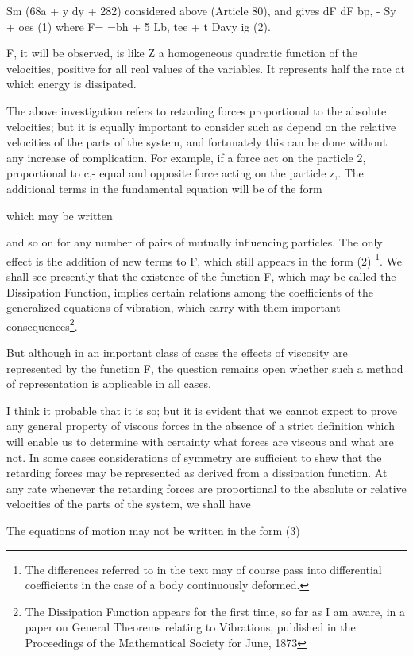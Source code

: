 Sm (68a + y dy + 282) considered above (Article 80), and gives dF dF bp, - Sy +
oes (1) where F= =bh + 5 Lb, tee + t Davy ig (2).

F, it will be observed, is like Z a homogeneous quadratic function of the
velocities, positive for all real values of the variables. It represents half
the rate at which energy is dissipated.

The above investigation refers to retarding forces proportional to the absolute
velocities; but it is equally important to consider such as depend on the
relative velocities of the parts of the system, and fortunately this can be
done without any increase of complication. For example, if a force act on the
particle 2, proportional to c,- equal and opposite force acting on the particle
z,. The additional terms in the fundamental equation will be of the form

which may be written

and so on for any number of pairs of mutually influencing particles.  The only
effect is the addition of new terms to F, which still appears in the form (2)
\footnote{The differences referred to in the text may of course pass into
differential coefficients in the case of a body continuously deformed.}.  We
shall see presently that the existence of the function F, which may be called
the Dissipation Function, implies certain relations among the coefficients of
the generalized equations of vibration, which carry with them important
consequences\footnote{The Dissipation Function appears for the first time, so
far as I am aware, in a paper on General Theorems relating to Vibrations,
published in the Proceedings of the Mathematical Society for June, 1873}.

But although in an important class of cases the effects of viscosity are
represented by the function F, the question remains open whether such a method
of representation is applicable in all cases.

I think it probable that it is so; but it is evident that we cannot expect to
prove any general property of viscous forces in the absence of a strict
definition which will enable us to determine with certainty what forces are
viscous and what are not.  In some cases considerations of symmetry are
sufficient to shew that the retarding forces may be represented as derived from
a dissipation function.  At any rate whenever the retarding forces are
proportional to the absolute or relative velocities of the parts of the system,
we shall have

The equations of motion may not be written in the form (3)

